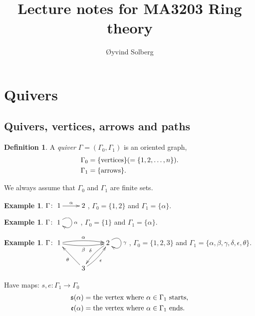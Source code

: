 \documentclass{amsart}
\numberwithin{equation}{section}
\theoremstyle{definition}
\newtheorem{defin}[thm]{Definition}
\newtheorem{exam}[thm]{Example}
\newcommand{\G}{\Gamma}
\begin{document}
\title{Lecture notes for MA3203 Ring theory}

\author{\O yvind Solberg}
\address{Department of Mathematical Sciences\\
NTNU\\
N-7491 Trondheim, Norway}

\maketitle
\tableofcontents

\section{Quivers}
\subsection{Quivers, vertices, arrows and paths}
\begin{defin}
A \emph{quiver} $\G = (\G_0,\G_1)$ is an oriented graph,
\begin{align}
\G_0 & = \{\text{vertices}\index{quiver!vertices}\}  (= \{1,2,\ldots,n\}).\notag\\
\G_1 & = \{\text{arrows}\index{quiver!arrows}\}.\notag
\end{align}
\end{defin}
We always assume that $\G_0$ and $\G_1$ are finite sets.

\begin{exam}
$\G\colon \xymatrix{1\ar[r]^\alpha & 2}$, $\G_0=\{1,2\}$ and $\G_1=\{\alpha\}$. 
\end{exam}

\begin{exam}
$\G\colon \xymatrix{1\ar@(ur,dr)[]^\alpha}$, $\G_0=\{1\}$ and $\G_1=\{\alpha\}$. 
\end{exam}

\begin{exam} $\G\colon
  \xymatrix{1\ar@/^.3pc/[rr]^\alpha\ar@/_.3pc/[rr]_\beta & & 2\ar@(ur,dr)[]^\gamma\ar@/_0.3pc/[dl]_\delta\\
    & 3\ar[ul]^\theta\ar@/_0.3pc/[ur]_\epsilon & }$, $\G_0=\{1,2,3\}$ and $\G_1=\{\alpha,\beta,\gamma,\delta,\epsilon, \theta\}$.  
\end{exam}
Have maps: $s, e\colon \G_1\to \G_0$
\begin{align}
\mathfrak{s}(\alpha) & = \text{the vertex where $\alpha\in\G_1$ starts,}\notag\index{$\mathfrak{s}$}\\
\mathfrak{e}(\alpha) & = \text{the vertex where $\alpha\in\G_1$ ends.}\notag\index{$\mathfrak{e}$}
\end{align}
\end{document}
